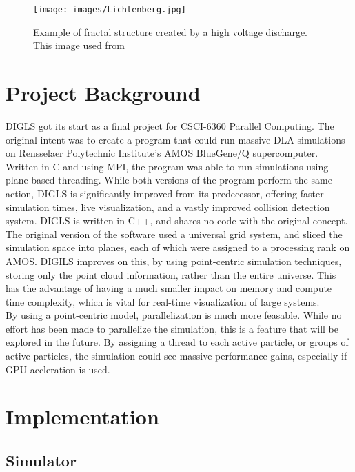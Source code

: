 \documentclass[fleqn,10pt]{UserGuideArx} %
\begin{document}
\begin{figure}[!h]\centering %
    \texttt{[image: images/Lichtenberg.jpg]}
    \caption{Example of fractal structure created by a high voltage discharge. This image used from \cite{wikiLightning:2017}}
    \label{fig:lightning}
\end{figure}
    
\section{Project Background}
DIGLS got its start as a final project for CSCI-6360 Parallel Computing. The original intent was to create a program that could run massive DLA simulations on Rensselaer Polytechnic Institute's AMOS BlueGene/Q supercomputer. Written in C and using MPI, the program was able to run simulations using plane-based threading. While both versions of the program perform the same action, DIGLS is significantly improved from its predecessor, offering faster simulation times, live visualization, and a vastly improved collision detection system. DIGLS is written in C++, and shares no code with the original concept.\\

The original version of the software used a universal grid system, and sliced the simulation space into planes, each of which were assigned to a processing rank on AMOS. DIGILS improves on this, by using point-centric simulation techniques, storing only the point cloud information, rather than the entire universe. This has the advantage of having a much smaller impact on memory and compute time complexity, which is vital for real-time visualization of large systems.\\

By using a point-centric model, parallelization is much more feasable. While no effort has been made to parallelize the simulation, this is a feature that will be explored in the future. By assigning a thread to each active particle, or groups of active particles, the simulation could see massive performance gains, especially if GPU accleration is used.\\



\section{Implementation}
\subsection{Simulator}
\end{document}
